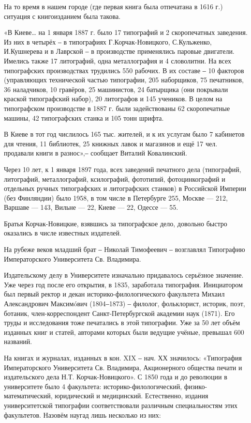 На то время в нашем городе (где первая книга была отпечатана в 1616 г.)
ситуация с книгоизданием была такова.  

 «В Киеве… на 1 января 1887 г. было 17 типографий  и 2 скоропечатных заведения.
 Из них в четырёх ‒ в типографиях Г.Корчак-Новицкого, С.Кульженко, И.Кушнерева
 и в Лаврской ‒ в производстве применялись паровые двигатели. Имелись также 17
 литографий, одна металлография и 4 словолитни. На всех типографских
 производствах трудились 550 рабочих. В их составе ‒ 10 факторов (управляющих
 технической частью типографии, 205 наборщиков, 75 печатников, 36 наладчиков,
 10 гравёров, 25 машинистов, 24 батырщика (они покрывали краской типографский
 набор), 20 литографов и 145 учеников. В целом на типографском производстве в
 1887 г. были задействованы 62 скоропечатные машины, 42 типографских станка и
 105 тонн шрифта.

В Киеве в тот год числилось 165 тыс. жителей, и к их услугам было 7 кабинетов
для чтения, 11 библиотек, 25 книжных лавок и магазинов и ещё 17 чел. продавали
книги в разнос»,‒ сообщает  Виталий Ковалинский.

Через 10 лет, к 1 января 1897 года, всех заведений печатного дела (типографий,
литографий, металлографий, ксилографий, фототипий, фотоцинкографий и отдельных
ручных типографских и литографских станков) в Российской Империи (без
Финляндии) было 1958, в том числе в Петербурге 255, Москве — 212, Варшаве —
143, Вильне — 22, Киеве — 22, Одессе — 55.

Братья Корчак-Новицкие, взявшись за типографское дело, довольно быстро
оказались в числе известных издателей.

На рубеже веков младший брат ‒ Николай Тимофеевич ‒ возглавлял Типографию
Императорского Университета Св. Владимира. 

Издательскому делу в Университете изначально придавалось серьёзное значение.
Уже через год после его открытия, в 1835, заработала типография. Инициатором
был первый ректор и декан историко-филологического факультета Михаил
Александрович Максимóвич (1804‒1873) ‒ филолог, фольклорист, историк, поэт,
ботаник, член-корреспондент Санкт-Петербургской академии наук (1871). Его труды
и исследования тоже печатались в этой типографии. Уже за 50 лет объём изданных
книг и статей, авторами которых были ведущие учёные, превышал 600 названий. 

На книгах и журналах, изданных в кон. XIX ‒ нач. ХХ значилось: «Типография
Императорского Университета Св. Владимира, Акционерного общества печати и
издательского дела Н.Т. Корчак-Новицкого». С 1850 года и до революции в
университете было 4 факультета: историко-филологический, физико-математический,
юридический и медицинский. Естественно, издания университетской типографии
соответствовали различным специальностям этих факультетов. Назовём наугад лишь
несколько из них:

